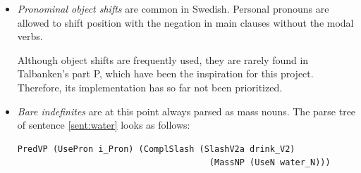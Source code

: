 \documentclass{report}
\begin{document}
\begin{itemize}
\item
\textit{Pronominal object shifts} are common in Swedish.
Personal pronouns are allowed to shift position with the negation in main clauses without
the modal verbs.


Although object shifts are frequently used, they are rarely found in
Talbanken's part P, which have been the inspiration for this project.
Therefore, its implementation has so far not been prioritized.\\




\item
\textit{Bare indefinites} are at this point always parsed as mass nouns.
\label{sent:water}
The parse tree of sentence \ref{sent:water} looks as follows:
\begin{verbatim}
PredVP (UsePron i_Pron) (ComplSlash (SlashV2a drink_V2) 
                                      (MassNP (UseN water_N))) 
\end{verbatim}


\end{itemize}
\end{document}
